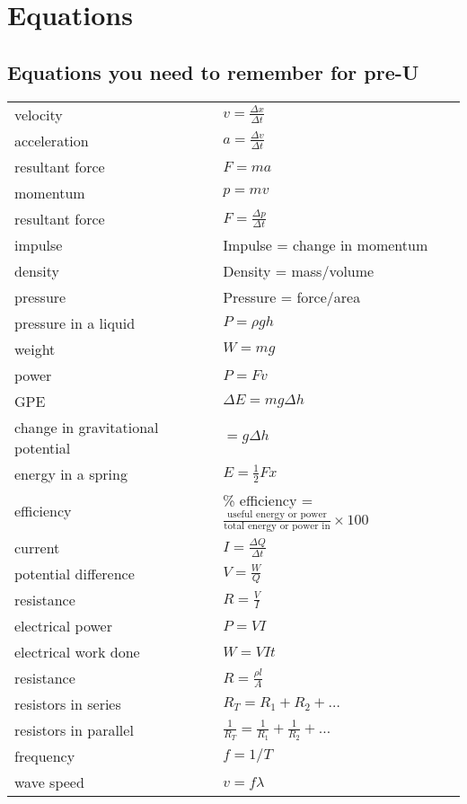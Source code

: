 \documentclass[main.tex]{subfiles}
\begin{document}
\chapter{Equations}
\setlength{\LTleft}{0pt}
\section{Equations you need to remember for pre-U}

\renewcommand*{\arraystretch}{2}
\begin{longtable}{ll}
velocity & $v= \frac{\Delta x}{\Delta t}$ \\
acceleration & $a= \frac{\Delta v}{\Delta t}$ \\
resultant force & $F=ma$ \\
momentum & $p=mv$ \\
resultant force & $F=\frac{\Delta p}{\Delta t}$ \\
impulse & Impulse = change in momentum \\
density & Density = mass/volume \\
pressure & Pressure = force/area \\
pressure in a liquid & $P = \rho gh$ \\
weight & $W = mg$ \\
power & $P = Fv$ \\
GPE & $\Delta E = mg \Delta h$ \\
change in gravitational potential & $=g \Delta h $ \\
energy in a spring & $E = \frac{1}{2} Fx$ \\
efficiency & \% efficiency =
$\frac{\text{useful energy or power}}{\text{total energy or power in}}
\times 100$ \\
current & $I = \frac{\Delta Q}{\Delta t}$ \\
potential difference & $V = \frac{W}{Q}$ \\
resistance & $R = \frac{V}{I}$ \\
electrical power & $P = VI$ \\
electrical work done & $W = VIt$\\
resistance & $R = \frac{\rho l}{A}$ \\
resistors in series & $R_T = R_1 + R_2 + \ldots{}$\\
resistors in parallel &
\(\frac{1}{R_{T}} = \frac{1}{R_{1}} + \frac{1}{R_{2}} + \ldots\)\\
frequency & $f = 1/T$\\
wave speed & $v = f\lambda$\\

\end{longtable}
\end{document}

